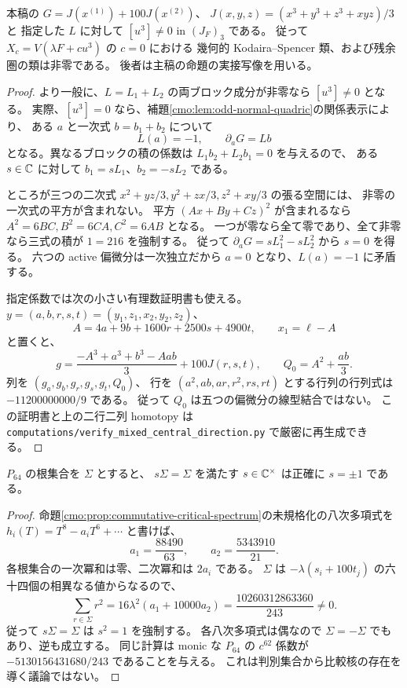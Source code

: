 \begin{proposition}[指定族の非零な中心接方向]
\label{cmo:prop:central-direction-nonzero}
本稿の $G=J(x^{(1)})+100J(x^{(2)})$、
$J(x,y,z)=(x^3+y^3+z^3+xyz)/3$ と
指定した $L$ に対して $[u^3]\ne0$ in $(J_F)_3$ である。
従って $X_c=V(\lambda F+cu^3)$ の $c=0$ における
幾何的 Kodaira--Spencer 類、および残余圏の類は非零である。
後者は主稿の命題の実接写像を用いる。
\end{proposition}
\begin{proof}
より一般に、$L=L_1+L_2$ の両ブロック成分が非零なら $[u^3]\ne0$ となる。
実際、$[u^3]=0$ なら、補題\ref{cmo:lem:odd-normal-quadric}の関係表示により、
ある $a$ と一次式 $b=b_1+b_2$ について
\[
 L(a)=-1,\qquad \partial_aG=Lb
\]
となる。異なるブロックの積の係数は
$L_1b_2+L_2b_1=0$ を与えるので、
ある $s\in\mathbb C$ に対して $b_1=sL_1$、$b_2=-sL_2$ である。

ところが三つの二次式
$x^2+yz/3,y^2+zx/3,z^2+xy/3$ の張る空間には、
非零の一次式の平方が含まれない。
平方 $(Ax+By+Cz)^2$ が含まれるなら
$A^2=6BC,B^2=6CA,C^2=6AB$ となる。
一つが零なら全て零であり、全て非零なら三式の積が $1=216$ を強制する。
従って $\partial_aG=sL_1^2-sL_2^2$ から $s=0$ を得る。
六つの active 偏微分は一次独立だから $a=0$ となり、$L(a)=-1$ に矛盾する。

指定係数では次の小さい有理数証明書も使える。
$y=(a,b,r,s,t)=(y_1,z_1,x_2,y_2,z_2)$、
\[
 A=4a+9b+1600r+2500s+4900t,\qquad x_1=\ell-A
\]
と置くと、
\[
 g=\frac{-A^3+a^3+b^3-Aab}{3}+100J(r,s,t),\qquad
 Q_0=A^2+\frac{ab}{3}.
\]
列を $(g_a,g_b,g_r,g_s,g_t,Q_0)$、
行を $(a^2,ab,ar,r^2,rs,rt)$ とする行列の行列式は
$-11200000000/9$ である。
従って $Q_0$ は五つの偏微分の線型結合ではない。
この証明書と上の二行二列 homotopy は
\texttt{computations/verify\_mixed\_central\_direction.py} で厳密に再生成できる。
\end{proof}

\begin{lemma}
\label{cmo:lem:critical-spectrum-scaling}
$P_{64}$ の根集合を $\Sigma$ とすると、
$s\Sigma=\Sigma$ を満たす $s\in\mathbb C^\times$ は正確に $s=\pm1$ である。
\end{lemma}
\begin{proof}
命題\ref{cmo:prop:commutative-critical-spectrum}の未規格化の八次多項式を
$h_i(T)=T^8-a_iT^6+\cdots$ と書けば、
\[
 a_1=\frac{88490}{63},\qquad a_2=\frac{5343910}{21}.
\]
各根集合の一次冪和は零、二次冪和は $2a_i$ である。
$\Sigma$ は $-\lambda(s_i+100t_j)$ の六十四個の相異なる値からなるので、
\[
 \sum_{r\in\Sigma}r^2
   =16\lambda^2(a_1+10000a_2)
   =\frac{10260312863360}{243}\ne0.
\]
従って $s\Sigma=\Sigma$ は $s^2=1$ を強制する。
各八次多項式は偶なので $\Sigma=-\Sigma$ でもあり、逆も成立する。
同じ計算は monic な $P_{64}$ の $c^{62}$ 係数が
$-5130156431680/243$ であることを与える。
これは判別集合から比較核の存在を導く議論ではない。
\end{proof}

